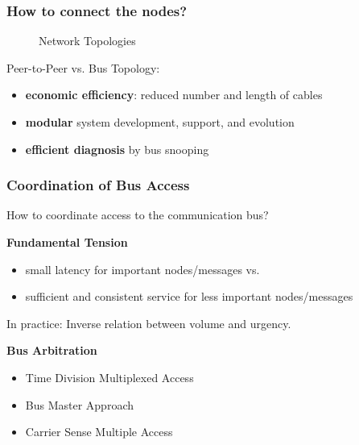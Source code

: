 \documentclass{beamer}
\renewcommand{\emph}[1]{\textbf{\textcolor{greeniot2}{#1}}}
\newcommand{\paragraph}[1]{\vspace{6pt}\textbf{#1}}
\begin{document}
\begin{frame}
  \frametitle{How to connect the nodes?}
  
  \begin{figure}[H]
    \hspace{.8cm}
    \caption{Network Topologies}
  \end{figure}
  
 	Peer-to-Peer vs. Bus Topology:
 	\begin{itemize}
   	\item \emph{economic efficiency}: reduced number and length of cables
 	  \item \emph{modular} system development, support, and evolution
   	\item \emph{efficient diagnosis} by bus snooping
 	\end{itemize}
\end{frame}

\begin{frame}
  \frametitle{Coordination of Bus Access}
  
  How to coordinate access to the communication bus?
  
  \paragraph{Fundamental Tension}
  \begin{itemize}
    \item small latency for important nodes/messages vs.
    \item sufficient and consistent service for less important nodes/messages
  \end{itemize}
  
  In practice: Inverse relation between volume and urgency.
  
  \paragraph{Bus Arbitration}
  \begin{itemize}
    \item Time Division Multiplexed Access
    \item Bus Master Approach
    \item Carrier Sense Multiple Access
  \end{itemize}
\end{frame}
\end{document}
